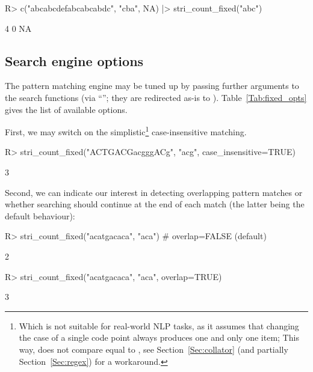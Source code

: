 \documentclass[nojss]{jss}
\begin{document}
\begin{Schunk}
\begin{Sinput}
R> c("abcabcdefabcabcabdc", "cba", NA) |> stri_count_fixed("abc")
\end{Sinput}
\begin{Soutput}
[1]  4  0 NA
\end{Soutput}
\end{Schunk}
\fi



\subsection{Search engine options}

The pattern matching engine may be tuned up by passing
further arguments to the search functions (via ``'';
they are redirected as-is to ).
Table~\ref{Tab:fixed_opts} gives the list of available options.





First, we may switch on the simplistic\footnote{Which is not suitable
for real-world NLP tasks, as it assumes
that changing the case of a single code point always produces one and only
one item;
This way,  does not compare equal to ,
see Section~\ref{Sec:collator} (and partially Section~\ref{Sec:regex}) for a workaround.}
case-insensitive matching.


\begin{Schunk}
\begin{Sinput}
R> stri_count_fixed("ACTGACGacgggACg", "acg", case_insensitive=TRUE)
\end{Sinput}
\begin{Soutput}
[1] 3
\end{Soutput}
\end{Schunk}

Second, we can indicate our interest in detecting
overlapping pattern matches or whether searching should continue
at the end of each match
(the latter being the default behaviour):

\begin{Schunk}
\begin{Sinput}
R> stri_count_fixed("acatgacaca", "aca")  # overlap=FALSE (default)
\end{Sinput}
\begin{Soutput}
[1] 2
\end{Soutput}
\begin{Sinput}
R> stri_count_fixed("acatgacaca", "aca", overlap=TRUE)
\end{Sinput}
\begin{Soutput}
[1] 3
\end{Soutput}
\end{Schunk}
\end{document}
